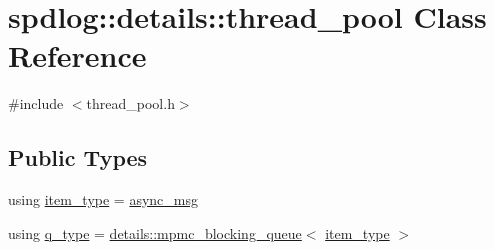\hypertarget{classspdlog_1_1details_1_1thread__pool}{}\section{spdlog\+:\+:details\+:\+:thread\+\_\+pool Class Reference}
\label{classspdlog_1_1details_1_1thread__pool}


{\ttfamily \#include $<$thread\+\_\+pool.\+h$>$}

\subsection*{Public Types}
\begin{DoxyCompactItemize}
\item 
using \hyperlink{classspdlog_1_1details_1_1thread__pool_a997d954a51e8fa8aa92071d1a9c08536}{item\+\_\+type} = \hyperlink{structspdlog_1_1details_1_1async__msg}{async\+\_\+msg}
\item 
using \hyperlink{classspdlog_1_1details_1_1thread__pool_a77d633d56b0b5e1fe37965faa4642df5}{q\+\_\+type} = \hyperlink{classspdlog_1_1details_1_1mpmc__blocking__queue}{details\+::mpmc\+\_\+blocking\+\_\+queue}$<$ \hyperlink{classspdlog_1_1details_1_1thread__pool_a997d954a51e8fa8aa92071d1a9c08536}{item\+\_\+type} $>$
\end{DoxyCompactItemize}
